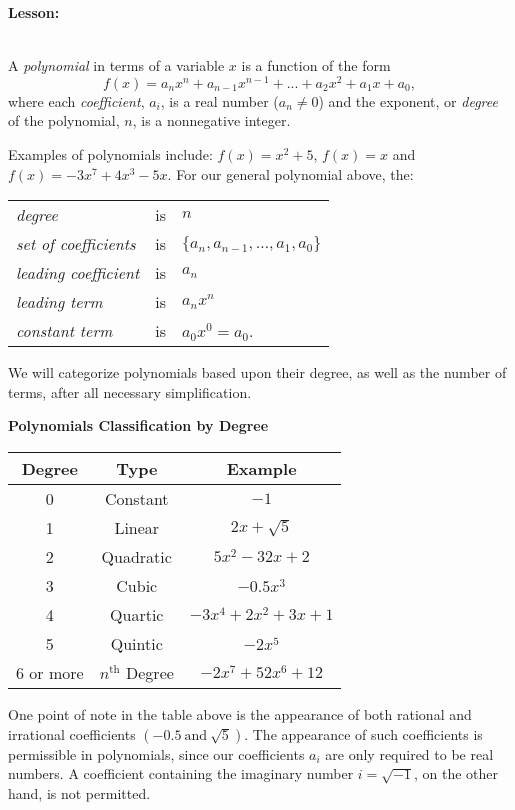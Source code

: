 \documentclass[12pt]{article}
\theoremstyle{definition}
\begin{document}
{\bf Lesson:}\\
\ \par
A {\it polynomial} in terms of a variable $x$ is a function of the form
$$f(x) = a_{n}x^{n} + a_{n-1}x^{n-1}+ ... + a_{2}x^2 + a_{1}x + a_{0},$$
where each {\it coefficient}, $a_{i}$, is a real number ($a_n\neq 0$) and the exponent, or {\it degree} of the polynomial, $n$, is a nonnegative integer.
\par
Examples of polynomials include: $f(x) = x^2 + 5$, $f(x)=x$ and $f(x) = -3x^7+4x^3-5x$.  For our general polynomial above, the:
\begin{center}
\begin{tabular}{lcl}
{\it degree} & is & $n$\\
{\it set of coefficients} & is & $\{a_n,a_{n-1},\ldots,a_1,a_0\}$\\
{\it leading coefficient} & is & $a_n$\\
{\it leading term} & is & $a_nx^n$\\
{\it constant term} & is & $a_0x^0=a_0$.
\end{tabular}
\end{center}
We will categorize polynomials based upon their degree, as well as the number of terms, after all necessary simplification.
\begin{center}
{\bf Polynomials Classification by Degree}
\par
\begin{tabular}{ | c | c | c | } 
\hline
Degree & Type & Example \\ 
\hline
0 & Constant & $-1$ \\ 
\hline
1 & Linear & $2x+\sqrt{5}$ \\ 
\hline
2 & Quadratic & $5x^2 - 32x+2$ \\ 
\hline
3 & Cubic & $-0.5x^{3}$ \\ 
\hline
4 & Quartic & $-3x^{4} +2x^2+3x + 1$ \\ 
\hline
5  & Quintic & $-2x^5$ \\ 
\hline
6 or more  & $n^{\text{th}}$ Degree & $-2x^{7} + 52x^6 + 12$ \\ 
\hline
\end{tabular}
\end{center}
One point of note in the table above is the appearance of both rational and irrational coefficients $\left(-0.5 \ \text{and} \ \sqrt{5}\right)$.  The appearance of such coefficients is permissible in polynomials, since our coefficients $a_i$ are only required to be real numbers.  A coefficient containing the imaginary number $i=\sqrt{-1}$, on the other hand, is not permitted.
\end{document}

